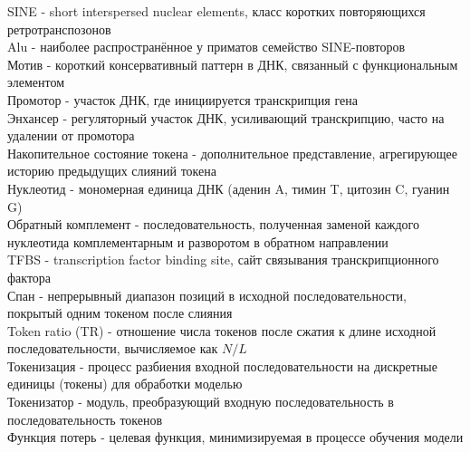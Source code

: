 SINE - short interspersed nuclear elements, класс коротких
повторяющихся ретротранспозонов\\[0.5em]
Alu - наиболее распространённое у приматов семейство SINE-повторов\\[0.5em]
Мотив - короткий консервативный паттерн в ДНК, связанный с
функциональным элементом\\[0.5em]
Промотор - участок ДНК, где инициируется транскрипция гена\\[0.5em]
Энхансер - регуляторный участок ДНК, усиливающий транскрипцию, часто
на удалении от промотора\\[0.5em]
Накопительное состояние токена - дополнительное представление,
агрегирующее историю предыдущих слияний токена\\[0.5em]
Нуклеотид - мономерная единица ДНК (аденин A, тимин T, цитозин C,
гуанин G)\\[0.5em]
Обратный комплемент - последовательность, полученная заменой каждого
нуклеотида комплементарным и разворотом в обратном направлении\\[0.5em]
TFBS - transcription factor binding site, сайт связывания
транскрипционного фактора\\[0.5em]
Спан - непрерывный диапазон позиций в исходной последовательности,
покрытый одним токеном после слияния\\[0.5em]
Token ratio (TR) - отношение числа токенов после сжатия к длине
исходной последовательности, вычисляемое как $N/L$\\[0.5em]
Токенизация - процесс разбиения входной последовательности на
дискретные единицы (токены) для обработки моделью\\[0.5em]
Токенизатор - модуль, преобразующий входную последовательность в
последовательность токенов\\[0.5em]
Функция потерь - целевая функция, минимизируемая в процессе обучения модели
